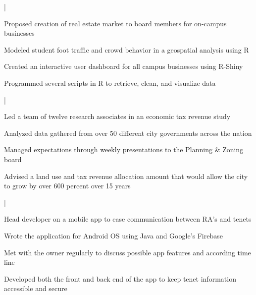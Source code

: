 \documentclass[letterpaper]{deedy-resume}
\begin{document}
\begin{minipage}[t]{0.65\textwidth}
\sectionspace 

 |
\begin{tightitemize}
\item Proposed creation of real estate market to board members for on-campus businesses\\
\item Modeled student foot traffic and crowd behavior in a geospatial analysis using R \\
\item Created an interactive user dashboard for all campus businesses using R-Shiny \\
\item Programmed several scripts in R to retrieve, clean, and visualize data 
\end{tightitemize}

\sectionspace 

 |
\begin{tightitemize}
\item Led a team of twelve research associates in an economic tax revenue study\\
\item Analyzed data gathered from over 50 different city governments across the nation\\
\item Managed expectations through weekly presentations to the Planning \& Zoning board\\
\item Advised a land use and tax revenue allocation amount that would allow the city to grow by over 600 percent over 15 years
\end{tightitemize}

\sectionspace

|
\begin{tightitemize}
\item Head developer on a mobile app to  ease communication between RA's and tenets\\
\item Wrote the application for Android OS using Java and Google's Firebase\\
\item Met with the owner regularly to discuss possible app features and according time line\\
\item Developed both the front and back end of the app to keep tenet information accessible and secure
 \end{tightitemize}
    

\end{minipage}
\end{document}
